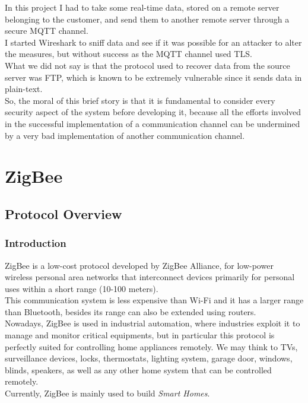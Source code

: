 \documentclass[12pt]{report}
\begin{document}
{In this project I had to take some real-time data, stored on a remote server belonging to the customer, and send them to another remote server through a secure MQTT channel.\\
I started Wireshark to sniff data and see if it was possible for an attacker to alter the measures, but without success as the MQTT channel used TLS.\\

What we did not say is that the protocol used to recover data from the source server was FTP, which is known to be extremely vulnerable since it sends data in plain-text.\\


So, the moral of this brief story is that it is fundamental to consider every security aspect of the system before developing it, because all the efforts involved in the successful implementation of a communication channel can be undermined by a very bad implementation of another communication channel.\\


\part{ZigBee}

\chapter{Protocol Overview}

\section{Introduction}
\bigskip

ZigBee is a low-cost protocol developed by ZigBee Alliance, for low-power wireless personal area networks that interconnect devices primarily for personal uses within a short range (10-100 meters). \\
This communication system is less expensive than Wi-Fi and it has a larger range than Bluetooth, besides its range can also be extended using routers.\\

Nowadays, ZigBee is used in industrial automation, where industries exploit it to manage and monitor critical equipments, but in particular this protocol is perfectly suited for controlling home appliances remotely. We may think to TVs, surveillance devices, locks, thermostats, lighting system, garage door, windows, blinds, speakers, as well as any other home system that can be controlled remotely.\\
Currently, ZigBee is mainly used to build \emph{Smart Homes}.\\

}
\end{document}
